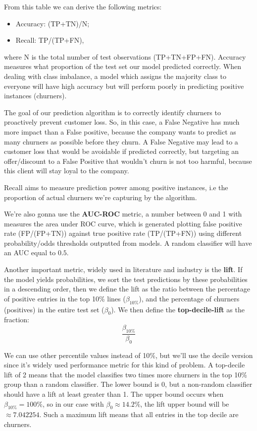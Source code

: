 \documentclass[12pt,letterpaper]{article}
\begin{document}
From this table we can derive the following metrics:
\begin{itemize}
	\item Accuracy: (TP+TN)/N;
	\item Recall: TP/(TP+FN),
\end{itemize}
where N is the total number of test observations (TP+TN+FP+FN). Accuracy measures what proportion of the test set our model predicted correctly. When dealing with class imbalance, a model which assigns the majority class to everyone will have high accuracy but will perform poorly in predicting positive instances (churners).

The goal of our prediction algorithm is to correctly identify churners to proactively prevent customer loss. So, in this case, a False Negative has much more impact than a False positive, because the company wants to predict as many churners as possible before they churn. A False Negative may lead to a customer loss that would be avoidable if predicted correctly, but targeting an offer/discount to a False Positive that wouldn't churn is not too harmful, because this client will stay loyal to the company.

Recall aims to measure prediction power among positive instances, i.e the proportion of actual churners we're capturing by the algorithm.

We're also gonna use the \textbf{AUC-ROC} metric, a number between 0 and 1 with measures the area under ROC curve, which is generated plotting false positive rate (FP/(FP+TN)) against true positive rate (TP/(TP+FN)) using different probability/odds thresholds outputted from models. A random classifier will have an AUC equal to $0.5$.

Another important metric, widely used in literature and industry is the \textbf{lift}\cite{class_imbalance}. If the model yields probabilities, we sort the test predictions by these probabilities in a descending order, then we define the lift as the ratio between the percentage of positive entries in the top 10\% lines ($\beta_ {10\%}$), and the percentage of churners (positives) in the entire test set ($\beta_0$). We then define the \textbf{top-decile-lift} as the fraction:
$$\dfrac{\beta_{10\%}}{\beta_0}$$

We can use other percentile values instead of 10\%, but we'll use the decile version since it's widely used performance metric for this kind of problem. A top-decile lift of 2 means that the model classifies two times more churners in the top 10\% group than a random classifier. The lower bound is 0, but a non-random classifier should have a lift at least greater than 1. The upper bound occurs when $\beta_ {10\%} = 100\%$, so in our case with $\beta_0\approx 14.2\%$, the lift upper bound will be $\approx 7.042254$. Such a maximum lift means that all entries in the top decile are churners.
\end{document}
